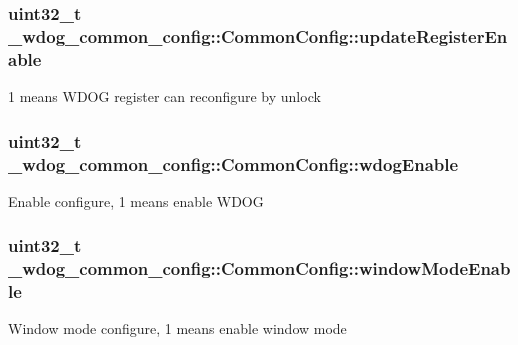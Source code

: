 \subsubsection[{\texorpdfstring{update\+Register\+Enable}{updateRegisterEnable}}]{\setlength{\rightskip}{0pt plus 5cm}uint32\+\_\+t \+\_\+wdog\+\_\+common\+\_\+config\+::\+Common\+Config\+::update\+Register\+Enable}\hypertarget{struct__wdog__common__config_1_1CommonConfig_a118082f4538f2739cf317c02ee820d30}{}\label{struct__wdog__common__config_1_1CommonConfig_a118082f4538f2739cf317c02ee820d30}
1 means W\+D\+OG register can reconfigure by unlock 
\subsubsection[{\texorpdfstring{wdog\+Enable}{wdogEnable}}]{\setlength{\rightskip}{0pt plus 5cm}uint32\+\_\+t \+\_\+wdog\+\_\+common\+\_\+config\+::\+Common\+Config\+::wdog\+Enable}\hypertarget{struct__wdog__common__config_1_1CommonConfig_a153e2511611a0ace9deb5bd69f4e0580}{}\label{struct__wdog__common__config_1_1CommonConfig_a153e2511611a0ace9deb5bd69f4e0580}
Enable configure, 1 means enable W\+D\+OG 
\subsubsection[{\texorpdfstring{window\+Mode\+Enable}{windowModeEnable}}]{\setlength{\rightskip}{0pt plus 5cm}uint32\+\_\+t \+\_\+wdog\+\_\+common\+\_\+config\+::\+Common\+Config\+::window\+Mode\+Enable}\hypertarget{struct__wdog__common__config_1_1CommonConfig_a8fbb0498618d8e02945d5696610c1d9d}{}\label{struct__wdog__common__config_1_1CommonConfig_a8fbb0498618d8e02945d5696610c1d9d}
Window mode configure, 1 means enable window mode 
